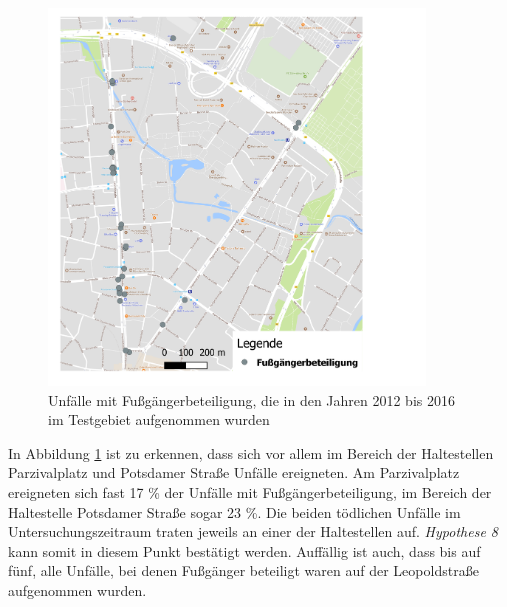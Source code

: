 \begin{savenotes}
	\begin{figure}[H]
		\centering
		\includegraphics[width=10cm,height=10cm]{figures/map_fussgaenger}
		\caption[Unfälle mit Fußgängerbeteiligung, die in den Jahren 2012 bis 2016 im Testgebiet aufgenommen wurden]{Unfälle mit Fußgängerbeteiligung, die in den Jahren 2012 bis 2016 im Testgebiet aufgenommen wurden}\label{fig:map_fussganeger}
	\end{figure}
\end{savenotes}

In Abbildung \ref{fig:map_fussganeger} ist zu erkennen, dass sich vor allem im Bereich der Haltestellen Parzivalplatz und Potsdamer Straße Unfälle ereigneten. Am Parzivalplatz ereigneten sich fast 17 \% der Unfälle mit Fußgängerbeteiligung, im Bereich der Haltestelle Potsdamer Straße sogar 23 \%. Die beiden tödlichen Unfälle im Untersuchungszeitraum traten jeweils an einer der Haltestellen auf. \textit{Hypothese 8} kann somit in diesem Punkt bestätigt werden. Auffällig ist auch, dass bis auf fünf, alle Unfälle, bei denen Fußgänger beteiligt waren auf der Leopoldstraße aufgenommen wurden.

